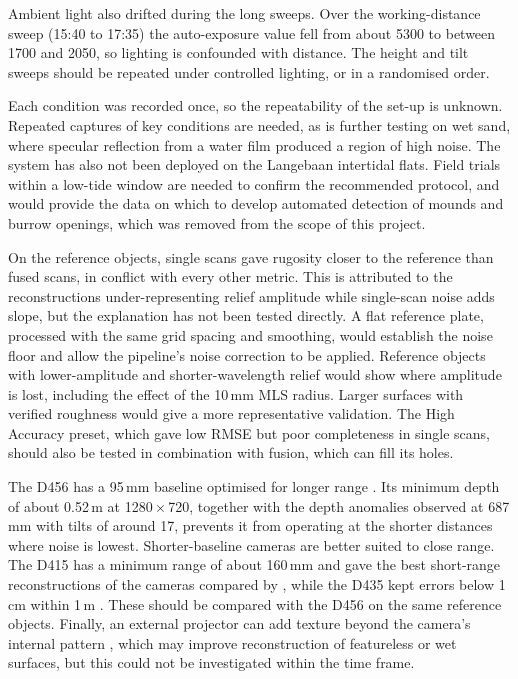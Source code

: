 Ambient light also drifted during the long sweeps. Over the working-distance sweep (15:40 to 17:35) the auto-exposure value fell from about 5300 to between 1700 and 2050, so lighting is confounded with distance. The height and tilt sweeps should be repeated under controlled lighting, or in a randomised order.

Each condition was recorded once, so the repeatability of the set-up is unknown. Repeated captures of key conditions are needed, as is further testing on wet sand, where specular reflection from a water film produced a region of high noise. The system has also not been deployed on the Langebaan intertidal flats. Field trials within a low-tide window are needed to confirm the recommended protocol, and would provide the data on which to develop automated detection of mounds and burrow openings, which was removed from the scope of this project.

On the reference objects, single scans gave rugosity closer to the reference than fused scans, in conflict with every other metric. This is attributed to the reconstructions under-representing relief amplitude while single-scan noise adds slope, but the explanation has not been tested directly. A flat reference plate, processed with the same grid spacing and smoothing, would establish the noise floor and allow the pipeline's noise correction to be applied. Reference objects with lower-amplitude and shorter-wavelength relief would show where amplitude is lost, including the effect of the 10\,mm MLS radius. Larger surfaces with verified roughness would give a more representative validation. The High Accuracy preset, which gave low RMSE but poor completeness in single scans, should also be tested in combination with fusion, which can fill its holes.

The D456 has a 95\,mm baseline optimised for longer range \cite{intel_d456}. Its minimum depth of about 0.52\,m at 1280\,$\times$\,720, together with the depth anomalies observed at 687\,mm with tilts of around 17\textdegree, prevents it from operating at the shorter distances where noise is lowest. Shorter-baseline cameras are better suited to close range. The D415 has a minimum range of about 160\,mm \cite{carfagniMetrologicalCriticalCharacterization2019} and gave the best short-range reconstructions of the cameras compared by \citet{serviMetrologicalCharacterizationComparison2021}, while the D435 kept errors below 1\,cm within 1\,m \cite{rustlerEmpiricalComparisonFour2025}. These should be compared with the D456 on the same reference objects. Finally, an external projector can add texture beyond the camera's internal pattern \cite{ProjectorsD400Series}, which may improve reconstruction of featureless or wet surfaces, but this could not be investigated within the time frame.

